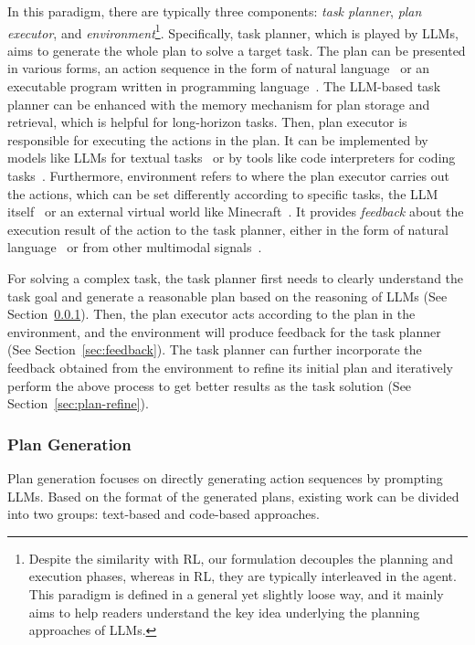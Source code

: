 In this paradigm, there are typically three components: \emph{task planner}, \emph{plan executor}, and \emph{environment}\footnote{
Despite the similarity with RL, our formulation decouples the planning and execution phases, whereas in RL, they are typically interleaved in the agent.
This paradigm is defined in a general yet slightly loose way, and it mainly aims to help readers understand the key idea underlying the planning approaches of LLMs.
}.
Specifically, task planner, which is played by LLMs, aims to generate the whole plan to solve a target task.
The plan can be presented in various forms, \eg an action sequence in the form of natural language~\cite{Zhou-arxiv-2022-Least} or an executable program written in programming language~\cite{Gao-arxiv-2022-PAL}.
The LLM-based task planner can be enhanced with the memory mechanism for plan storage and retrieval, which is helpful for long-horizon tasks.
Then, plan executor is responsible for executing the actions in the plan.
It can be implemented by models like LLMs for textual tasks~\cite{Wang-arXiv-2023-Plan} or by tools like code interpreters for coding tasks~\cite{Shinn-2023-arXiv-Reflexion}.
Furthermore, environment refers to where the plan executor carries out the actions, which can be set differently according to specific tasks, \eg the LLM itself~\cite{Yao-2023-arXiv-tree} or an external virtual world like Minecraft~\cite{Wang-2023-arXiv-voyager}.
It provides \textit{feedback} about the execution result of the action to the task planner, either in the form of natural language~\cite{Shinn-2023-arXiv-Reflexion} or from other multimodal signals~\cite{Lu-2023-arXiv-multimodal}.

For solving a complex task, the task planner first needs to clearly understand the task goal and generate a reasonable plan based on the reasoning of LLMs (See Section~\ref{sec:plan-gen}).
Then, the plan executor acts according to the plan in the environment, and the environment will produce feedback for the task planner (See Section~\ref{sec:feedback}).
The task planner can further incorporate the feedback obtained from the environment to refine its initial plan and iteratively perform the above process to get better results as the task solution (See Section~\ref{sec:plan-refine}).


\subsubsection{Plan Generation}
\label{sec:plan-gen}
Plan generation focuses on directly generating action sequences by prompting LLMs.
Based on the format of the generated plans, existing work can be divided into two groups: text-based and code-based approaches. 

